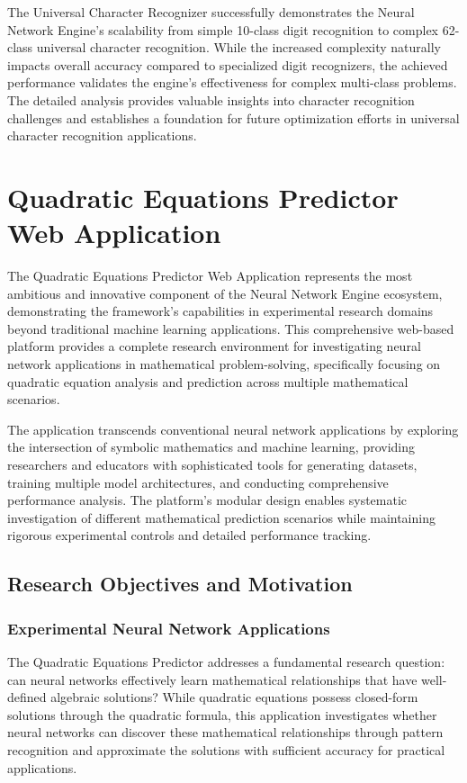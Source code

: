 \documentclass[11pt,a4paper]{report}
\begin{document}
The Universal Character Recognizer successfully demonstrates the Neural Network Engine's scalability from simple 10-class digit recognition to complex 62-class universal character recognition. While the increased complexity naturally impacts overall accuracy compared to specialized digit recognizers, the achieved performance validates the engine's effectiveness for complex multi-class problems. The detailed analysis provides valuable insights into character recognition challenges and establishes a foundation for future optimization efforts in universal character recognition applications.

\section{Quadratic Equations Predictor Web Application}

The Quadratic Equations Predictor Web Application represents the most ambitious and innovative component of the Neural Network Engine ecosystem, demonstrating the framework's capabilities in experimental research domains beyond traditional machine learning applications. This comprehensive web-based platform provides a complete research environment for investigating neural network applications in mathematical problem-solving, specifically focusing on quadratic equation analysis and prediction across multiple mathematical scenarios.

The application transcends conventional neural network applications by exploring the intersection of symbolic mathematics and machine learning, providing researchers and educators with sophisticated tools for generating datasets, training multiple model architectures, and conducting comprehensive performance analysis. The platform's modular design enables systematic investigation of different mathematical prediction scenarios while maintaining rigorous experimental controls and detailed performance tracking.

\subsection{Research Objectives and Motivation}

\subsubsection{Experimental Neural Network Applications}

The Quadratic Equations Predictor addresses a fundamental research question: can neural networks effectively learn mathematical relationships that have well-defined algebraic solutions? While quadratic equations possess closed-form solutions through the quadratic formula, this application investigates whether neural networks can discover these mathematical relationships through pattern recognition and approximate the solutions with sufficient accuracy for practical applications.
\end{document}
